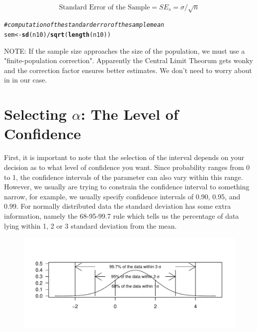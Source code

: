 \documentclass{tufte-handout}\usepackage[]{graphicx}\usepackage[]{color}
\makeatletter
\def\maxwidth{ %
  \ifdim\Gin@nat@width>\linewidth
    \linewidth
  \else
    \Gin@nat@width
  \fi
}
\newcommand{\hlcom}[1]{\textcolor[rgb]{0.678,0.584,0.686}{\textit{#1}}}%
\newcommand{\hlopt}[1]{\textcolor[rgb]{0,0,0}{#1}}%
\newcommand{\hlstd}[1]{\textcolor[rgb]{0.345,0.345,0.345}{#1}}%
\newcommand{\hlkwb}[1]{\textcolor[rgb]{0.69,0.353,0.396}{#1}}%
\newcommand{\hlkwd}[1]{\textcolor[rgb]{0.737,0.353,0.396}{\textbf{#1}}}%
\newenvironment{kframe}{%
 \def\at@end@of@kframe{}%
 \ifinner\ifhmode%
  \def\at@end@of@kframe{\end{minipage}}%
  \begin{minipage}{\columnwidth}%
 \fi\fi%
 \def\FrameCommand##1{\hskip\@totalleftmargin \hskip-\fboxsep
 \colorbox{shadecolor}{##1}\hskip-\fboxsep
     \hskip-\linewidth \hskip-\@totalleftmargin \hskip\columnwidth}%
 \MakeFramed {\advance\hsize-\width
   \@totalleftmargin\z@ \linewidth\hsize
   \@setminipage}}%
 {\par\unskip\endMakeFramed%
 \at@end@of@kframe}
\newenvironment{knitrout}{}{} %
\makeatother
\begin{document}
\begin{equation}
\textrm{Standard Error of the Sample} = SE_s = \sigma/\sqrt{n}
\end{equation}


\begin{knitrout}
\color{fgcolor}\begin{kframe}
\begin{alltt}
\hlcom{#computation of the standard error of the sample mean}
\hlstd{sem}\hlkwb{<-}\hlkwd{sd}\hlstd{(n10)}\hlopt{/}\hlkwd{sqrt}\hlstd{(}\hlkwd{length}\hlstd{(n10))}
\end{alltt}
\end{kframe}
\end{knitrout}

NOTE: If the sample size approaches the size of the population, we must use a "finite-population correction". Apparently the Central Limit Theorum gets wonky and the correction factor ensures better estimates. We don't need to worry about in in our case.


 
\section{Selecting $\alpha$: The Level of Confidence}

First, it is important to note that the selection of the interval depends on your decision as to what level of confidence you want. Since probability ranges from 0 to 1, the confidence intervals of the parameter can also vary within this range. However, we usually are trying to constrain the confidence interval to something narrow, for example, we usually specify confidence intervals of 0.90, 0.95, and 0.99. For normally distributed data the standard deviation has some extra information, namely the 68-95-99.7 rule which tells us the percentage of data lying within 1, 2 or 3 standard deviation from the mean.

\begin{figure}
\begin{knitrout}
\color{fgcolor}
\includegraphics[width=\maxwidth]{figure/unnamed-chunk-8-1} 

\end{knitrout}
\end{figure}
\end{document}
